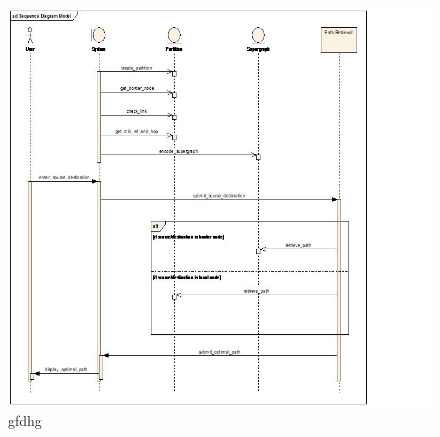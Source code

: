 \documentclass[10pt,a4paper,final]{article}
\begin{document}
\begin{figure}[hbtp]
\caption{gfdhg}
\includegraphics[scale=1]{seque.png}
\end{figure}
\end{document}
